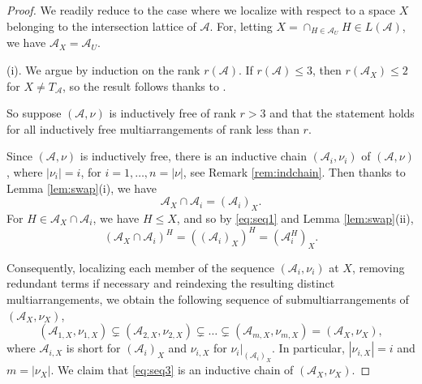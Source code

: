 \begin{proof}
We readily reduce to the case where 
we localize with respect to a space
$X$ belonging to the 
intersection lattice of ${{\mathcal A}}$. 
For, letting $X = \cap_{H \in {{\mathcal A}}_U} H \in L({{\mathcal A}})$,
 we have ${{\mathcal A}}_X = {{\mathcal A}}_U$.

(i).
We argue by induction on the rank $r({{\mathcal A}})$.
If $r({{\mathcal A}}) \le 3$, then 
$r({{\mathcal A}}_X) \le 2$ for $X \ne T_{{\mathcal A}}$, so
the result follows thanks to 
\cite[Cor.\ 7]{ziegler:multiarrangements}.

So suppose $({{\mathcal A}}, \nu)$ is inductively free of rank $r > 3$
and that the statement holds for 
all inductively free multiarrangements of rank less than $r$.

Since $({{\mathcal A}}, \nu)$ is inductively free, there is an
inductive chain  $({{\mathcal A}}_i, \nu_i)$  of $({{\mathcal A}}, \nu)$,  
where $|\nu_i| =i$, for $i = 1, \ldots, n = |\nu|$, 
see Remark \ref{rem:indchain}.
Then thanks to Lemma \ref{lem:swap}(i), we have
\begin{equation}
\label{eq:seq1}
{{\mathcal A}}_X \cap {{\mathcal A}}_i = ({{\mathcal A}}_i)_X.
\end{equation}
For $H \in {{\mathcal A}}_X \cap {{\mathcal A}}_i$, we have $H \le X$, and so by \eqref{eq:seq1} and Lemma \ref{lem:swap}(ii),  
\begin{equation}
\label{eq:seq2}
\left({{\mathcal A}}_X \cap {{\mathcal A}}_i\right)^{H} = \left(({{\mathcal A}}_i)_X\right)^{H} 
= \left({{\mathcal A}}_i^{H}\right)_X.
\end{equation}

Consequently, localizing each member of 
the sequence $({{\mathcal A}}_i, \nu_i)$ at $X$, removing redundant 
terms if necessary and reindexing the resulting distinct multiarrangements, 
we obtain the following sequence of submultiarrangements of 
$({{\mathcal A}}_X, \nu_X)$, 
\begin{equation}
\label{eq:seq3}
({{\mathcal A}}_{1,X}, \nu_{1,X}) \subsetneq ({{\mathcal A}}_{2,X}, \nu_{2,X})
\subsetneq  \ldots \subsetneq ({{\mathcal A}}_{m,X}, \nu_{m,X}) = ({{\mathcal A}}_X, \nu_X),
\end{equation}
where ${{\mathcal A}}_{i,X}$ is short for $({{\mathcal A}}_i)_X$ and 
$\nu_{i,X}$ for $\nu_i|_{({{\mathcal A}}_i)_X}$.
In particular, $|\nu_{i,X}| = i$ and 
$m = |\nu_X|$.
We claim that \eqref{eq:seq3} is an inductive chain of $({{\mathcal A}}_X, \nu_X)$.


\end{proof}
